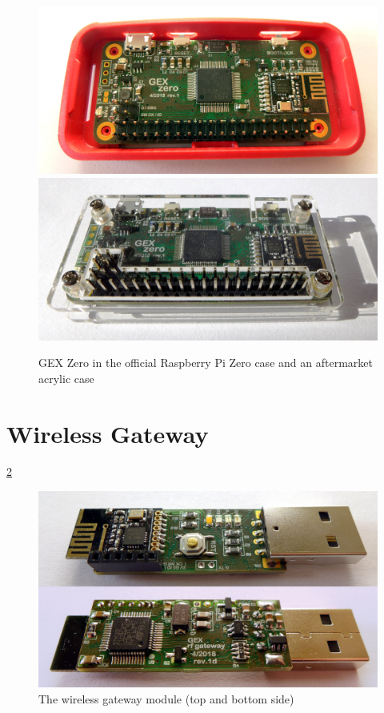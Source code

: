 \begin{figure}[h]
	\centering
	\includegraphics[width=.9\textwidth]{img/photo-zero-picase.jpg} \\
	\vspace{1mm}
	\includegraphics[width=.9\textwidth]{img/photo-zero-transparent.jpg}
	\caption[The GEX Zero module]{\label{fig:gexzcases}GEX Zero in the official Raspberry Pi Zero case and an aftermarket acrylic case}
\end{figure}


\section{Wireless Gateway}

\cref{fig:gwxgw}



\begin{figure}[h]
	\centering
	\includegraphics[width=.9\textwidth]{img/photo-rfdongle.jpg}
	\caption{\label{fig:gwxgw}The wireless gateway module (top and bottom side)}
\end{figure}


